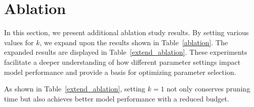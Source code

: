 \section{Ablation}
\label{app:ablation}
In this section, we present additional ablation study results. By setting various values for $k$, we expand upon the results shown in Table~\ref{ablation}. The expanded results are displayed in Table~\ref{extend_ablation}. These experiments facilitate a deeper understanding of how different parameter settings impact model performance and provide a basis for optimizing parameter selection.

As shown in Table~\ref{extend_ablation}, setting $k=1$ not only conserves pruning time but also achieves better model performance with a reduced budget.